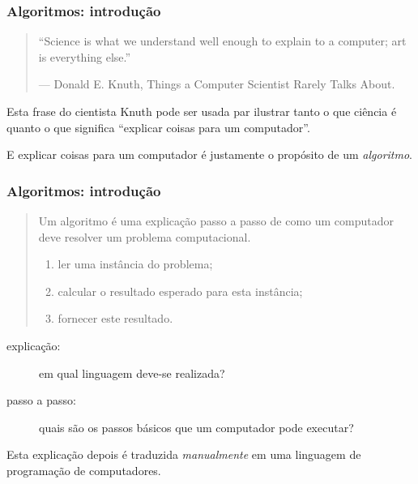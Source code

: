 \documentclass{beamer}
\begin{document}
\begin{frame}
  \frametitle{Algoritmos: introdução}

  \begin{quotation}
    ``Science is what we understand well enough to explain to a computer; art is
    everything else.''

    --- Donald E. Knuth, Things a Computer Scientist Rarely Talks About.
  \end{quotation}

  Esta frase do cientista Knuth pode ser usada par ilustrar tanto o
  que ciência é quanto o que significa ``explicar coisas para um
  computador''.

  E explicar coisas para um computador é justamente o propósito de um 
  \emph{algoritmo}.

\end{frame}

\begin{frame}
  \frametitle{Algoritmos: introdução}

  \begin{quote}
  Um algoritmo é uma explicação passo a passo de como um computador deve
  resolver um problema computacional.
  \begin{enumerate}
  \item<1> ler uma instância do problema;
  \item<1-3> calcular o resultado esperado para esta instância;
  \item<1> fornecer este resultado.
  \end{enumerate}
  \end{quote}
  \pause
  \pause
  \begin{description}
  \item[explicação:] em qual linguagem deve-se realizada?
  \item[passo a passo:] quais são os passos básicos que um computador
    pode executar?
  \end{description}
  Esta explicação depois é traduzida \emph{manualmente} em uma linguagem
  de programação de computadores.

\end{frame}
\end{document}
